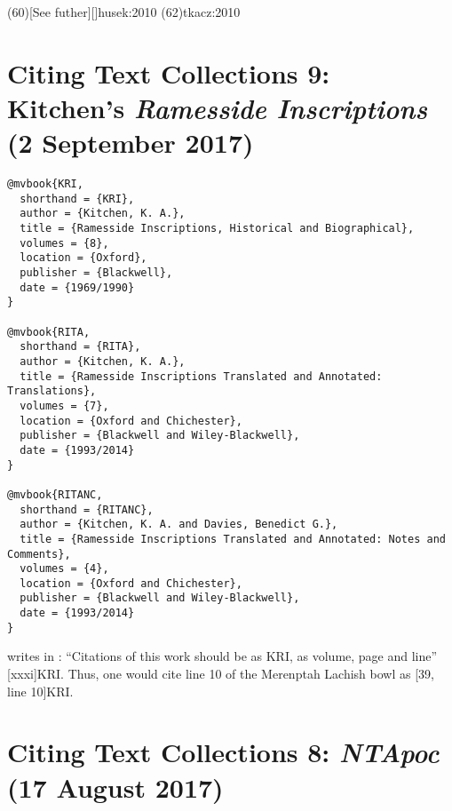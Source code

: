 \documentclass[a4paper]{article}
\begin{document}
\examplecite(60)[See futher][]{husek:2010}
\examplecite(62){tkacz:2010}
\exampleabbreviations
\examplebibliography
{}

\section{Citing Text Collections 9: Kitchen’s \emph{Ramesside Inscriptions} (2 September 2017)}

\begin{verbatim}
@mvbook{KRI,
  shorthand = {KRI},
  author = {Kitchen, K. A.},
  title = {Ramesside Inscriptions, Historical and Biographical},
  volumes = {8},
  location = {Oxford},
  publisher = {Blackwell},
  date = {1969/1990}
}

@mvbook{RITA,
  shorthand = {RITA},
  author = {Kitchen, K. A.},
  title = {Ramesside Inscriptions Translated and Annotated: Translations},
  volumes = {7},
  location = {Oxford and Chichester},
  publisher = {Blackwell and Wiley-Blackwell},
  date = {1993/2014}
}

@mvbook{RITANC,
  shorthand = {RITANC},
  author = {Kitchen, K. A. and Davies, Benedict G.},
  title = {Ramesside Inscriptions Translated and Annotated: Notes and Comments},
  volumes = {4},
  location = {Oxford and Chichester},
  publisher = {Blackwell and Wiley-Blackwell},
  date = {1993/2014}
}
\end{verbatim}

\begin{verbcite}
   writes in : “Citations of this work
  should be as KRI, as volume, page and line” [xxxi]{KRI}. Thus,
  one would cite line 10 of the Merenptah Lachish bowl as [39, line
  10]{KRI}.
\end{verbcite}
\begin{verbcite}
  \nocite{RITA, RITANC}
\end{verbcite}
\exampleabbreviations
{}

\section{Citing Text Collections 8: \emph{NTApoc} (17 August 2017)}
\end{document}
